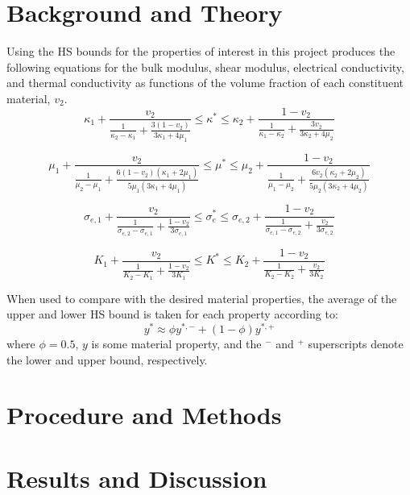 \documentclass[a4paper,12pt]{report}
\begin{document}
\section{Background and Theory}
Using the HS bounds for the properties of interest in this project produces the following equations for the bulk modulus, shear modulus, electrical conductivity, and thermal conductivity as functions of the volume fraction of each constituent material, $v_2$.
\begin{equation}
\kappa_1 + \frac{v_2}{ \frac{1}{\kappa_2-\kappa_1} + \frac{3(1-v_2)}{3\kappa_1 + 4\mu_1} } \leq \kappa^* \leq \kappa_2 + \frac{1-v_2}{ \frac{1}{\kappa_1-\kappa_2} + \frac{3v_2}{3\kappa_2 + 4\mu_2}}
\end{equation}

\begin{equation}
\mu_1 + \frac{v_2}{\frac{1}{\mu_2 - \mu_1} + \frac{6(1-v_2)(\kappa_1 + 2\mu_1)}{5\mu_1(3\kappa_1 + 4\mu_1)}} \leq \mu^* \leq \mu_2 + \frac{1-v_2}{\frac{1}{\mu_1-\mu_2} + \frac{6v_2(\kappa_2+2\mu_2)}{5\mu_2(3\kappa_2+4\mu_2)}}
\end{equation}

\begin{equation}
\sigma_{e,1} + \frac{v_2}{\frac{1}{\sigma_{e,2}-\sigma_{e,1}} + \frac{1-v_2}{3\sigma_{e,1}}} \leq \sigma^*_e \leq \sigma_{e,2} + \frac{1-v_2}{\frac{1}{\sigma_{e,1} - \sigma_{e,2}} + \frac{v_2}{3\sigma_{e,2}}}
\end{equation}

\begin{equation}
K_1 + \frac{v_2}{\frac{1}{K_2-K_1} + \frac{1-v_2}{3K_1}} \leq K^* \leq K_2 + \frac{1-v_2}{\frac{1}{K_2-K_2} + \frac{v_2}{3K_2}}
\end{equation}

When used to compare with the desired material properties, the average of the upper and lower HS bound is taken for each property according to:
\begin{equation}
y^* \approx \phi y^{*,-} + (1-\phi)y^{*,+}
\end{equation}
where $\phi = 0.5$, $y$ is some material property, and the $^-$ and $^+$ superscripts denote the lower and upper bound, respectively.



\section{Procedure and Methods}


\section{Results and Discussion}
\end{document}
